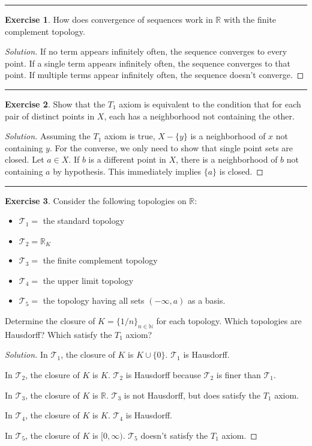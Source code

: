 \documentclass{article}
\theoremstyle{definition}
\newtheorem{exercise}{Exercise}[section]
\begin{document}
\hrule

\begin{exercise}
  How does convergence of sequences work in $\mathbb{R}$ with the finite complement topology.
\end{exercise}
\begin{proof}[Solution]
  If no term appears infinitely often, the sequence converges to every point. If a single term appears infinitely often, the sequence converges to that point. If multiple terms appear infinitely often, the sequence doesn't converge.
\end{proof}

\hrule

\begin{exercise}
  Show that the $T_1$ axiom is equivalent to the condition that for each pair of distinct points in $X$, each has a neighborhood not containing the other.
\end{exercise}
\begin{proof}[Solution]
  Assuming the $T_1$ axiom is true, $X - \{y\}$ is a neighborhood of $x$ not containing $y$. For the converse, we only need to show that single point sets are closed. Let $a\in X$. If $b$ is a different point in $X$, there is a neighborhood of $b$ not containing $a$ by hypothesis. This immediately implies $\{a\}$ is closed.
\end{proof}

\hrule

\begin{exercise}
  Consider the following topologies on $\mathbb{R}$:
  \begin{itemize}
    \item[] $\mathcal{T}_1 = $ the standard topology
    \item[] $\mathcal{T}_2 = \mathbb{R}_K$
    \item[] $\mathcal{T}_3 = $ the finite complement topology
    \item[] $\mathcal{T}_4 = $ the upper limit topology
    \item[] $\mathcal{T}_5 = $ the topology having all sets $(-\infty, a)$ as a basis.
  \end{itemize}
  Determine the closure of $K = \{1/n\}_{n\in\mathbb{N}}$ for each topology. Which topologies are Hausdorff? Which satisfy the $T_1$ axiom?
\end{exercise}
\begin{proof}[Solution]
  In $\mathcal{T}_1$, the closure of $K$ is $K\cup\{0\}$. $\mathcal{T}_1$ is Hausdorff.

  In $\mathcal{T}_2$, the closure of $K$ is $K$. $\mathcal{T}_2$ is Hausdorff because $\mathcal{T}_2$ is finer than $\mathcal{T}_1$.

  In $\mathcal{T}_3$, the closure of $K$ is $\mathbb{R}$. $\mathcal{T}_3$ is not Hausdorff, but does satisfy the $T_1$ axiom.

  In $\mathcal{T}_4$, the closure of $K$ is $K$. $\mathcal{T}_4$ is Hausdorff.

  In $\mathcal{T}_5$, the closure of $K$ is $[0,\infty)$. $\mathcal{T}_5$ doesn't satisfy the $T_1$ axiom.
\end{proof}
\end{document}

